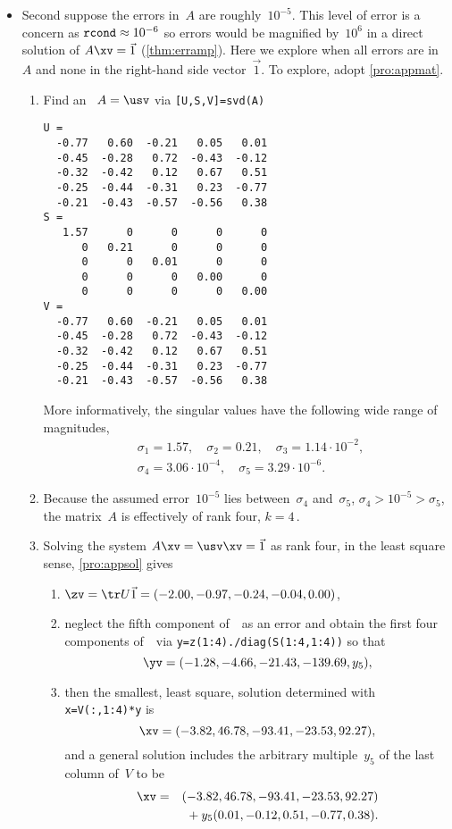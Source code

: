 \begin{example}
\begin{solution}
\begin{itemize}
\item Second suppose the errors in~\(A\) are roughly~\(10^{-5}\).
This level of error is a concern as \(\verb|rcond|\approx10^{-6}\) so errors would be magnified by~\(10^6\) in a direct solution of \(A\xv=\vec1\) (\cref{thm:erramp}).
Here we explore when all errors are in~\(A\) and none in the right-hand side vector~\(\vec 1\).
To explore, adopt \cref{pro:appmat}.
\begin{enumerate}
\item Find an \svd\ \(A=\usv\) via \verb|[U,S,V]=svd(A)| \twodp
\begin{verbatim}
U =
  -0.77   0.60  -0.21   0.05   0.01
  -0.45  -0.28   0.72  -0.43  -0.12
  -0.32  -0.42   0.12   0.67   0.51
  -0.25  -0.44  -0.31   0.23  -0.77
  -0.21  -0.43  -0.57  -0.56   0.38
S =
   1.57      0      0      0      0
      0   0.21      0      0      0
      0      0   0.01      0      0
      0      0      0   0.00      0
      0      0      0      0   0.00
V =
  -0.77   0.60  -0.21   0.05   0.01
  -0.45  -0.28   0.72  -0.43  -0.12
  -0.32  -0.42   0.12   0.67   0.51
  -0.25  -0.44  -0.31   0.23  -0.77
  -0.21  -0.43  -0.57  -0.56   0.38
\end{verbatim}
More informatively, the singular values have the following wide range of magnitudes, 
\begin{eqnarray*}
&&\sigma_1=1.57,\quad
\sigma_2=0.21,\quad
\sigma_3=1.14\cdot10^{-2},\quad
\\&&
\sigma_4=3.06\cdot10^{-4},\quad
\sigma_5=3.29\cdot10^{-6}.
\end{eqnarray*}
\item Because the assumed error~\(10^{-5}\) lies between~\(\sigma_4\) and~\(\sigma_5\), \(\sigma_4>10^{-5}>\sigma_5\), the matrix~\(A\) is effectively of rank four, \(k=4\)\,.
\item Solving the system \(A\xv=\usv\xv=\vec1\) as rank four, in the least square sense, \cref{pro:appsol} gives \twodp
\begin{enumerate}
\item \(\zv=\tr U\vec1=(-2.00,-0.97,-0.24,-0.04,0.00)\),
\item neglect the fifth component of~\zv\ as an error and obtain the first four components of~\yv\ via \verb|y=z(1:4)./diag(S(1:4,1:4))| so that
\begin{equation*}
\yv=(-1.28,-4.66,-21.43,-139.69,y_5),
\end{equation*}

\item then the smallest, least square, solution determined with 
\verb|x=V(:,1:4)*y| is
\begin{equation*}
\xv=(-3.82,46.78,-93.41,-23.53,92.27),
\end{equation*}
and a general solution includes the arbitrary multiple~\(y_5\) of the last column of~\(V\) to be
\begin{eqnarray*}
\xv&=&(-3.82,46.78,-93.41,-23.53,92.27)
\\&&{}+y_5(0.01,-0.12,0.51,-0.77,0.38).
\end{eqnarray*}
\end{enumerate}
\end{enumerate}


\end{itemize}
\end{solution}
\end{example}
